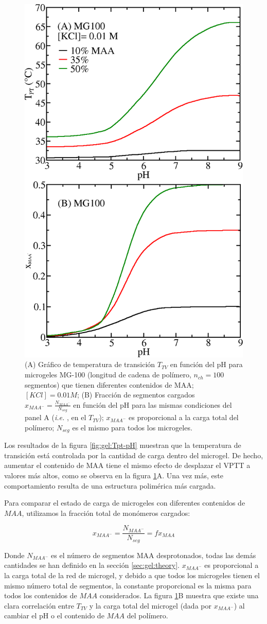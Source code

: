 \begin{figure}[!tb]
	\centering
	\includegraphics[width=0.5\linewidth]{Figures/graph-gel/Tpt-pH_MAA.png}
	\caption{(A) Gr\'afico de temperatura de transici\'on $T_{TV}$ en funci\'on del pH para microgeles MG-100 (longitud de cadena de pol\'imero, $n_{ch}=100$ segmentos) que tienen diferentes contenidos de MAA; $[KCl]=0.01 M$;
	(B) Fracci\'on de segmentos cargados $x_{MAA^-}=\frac{N_{MAA^-}}{N_{seg}}$ en funci\'on del pH para las mismas condiciones del panel A (\emph{i.e.} , en el $T_{TV}$); $x_{MAA^-}$ es proporcional a la carga total del pol\'imero; $N_{seg}$ es el mismo para todos los microgeles.}
	\label{fig:gel:Tpt_MAA}
\end{figure}

Los resultados de la figura \ref{fig:gel:Tpt-pH} muestran que la temperatura de transici\'on est\'a controlada por la cantidad de carga dentro del microgel. De hecho, aumentar el contenido de MAA tiene el mismo efecto de desplazar el VPTT a valores m\'as altos, como se observa en la figura \ref{fig:gel:Tpt_MAA}A. Una vez m\'as, este comportamiento resulta de una estructura polim\'erica m\'as cargada.

Para comparar el estado de carga de microgeles con diferentes contenidos de $MAA$, utilizamos la fracci\'on total de mon\'omeros cargados:

\begin{equation}
	x_{MAA^-}=\frac{N_{MAA^-}}{N_{seg}}=f x_{MAA}
\end{equation}

Donde $N_{MAA^-}$ es el n\'umero de segmentos MAA desprotonados, todas las dem\'as cantidades se han definido en la secci\'on \ref{sec:gel:theory}. $x_{MAA^-}$ es proporcional a la carga total de la red de microgel, y debido a que todos los microgeles tienen el mismo n\'umero total de segmentos, la constante proporcional es la misma para todos los contenidos de $MAA$ considerados. La figura \ref{fig:gel:Tpt_MAA}B muestra que existe una clara correlación entre $T_{TV}$ y la carga total del microgel (dada por $x_{MAA^-}$) al cambiar el pH o el contenido de $MAA$ del pol\'imero.


